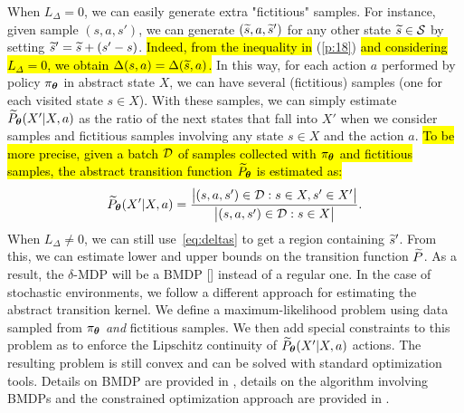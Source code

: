 %
When $L_{\Delta}=0$, we can easily generate extra "fictitious" samples. For instance, given sample $(s,a,s')$, we can generate $(\widetilde{s},a,\widetilde{s}')$ for any other state $\widetilde{s}\in\mathcal{S}$ by setting $\widetilde{s}' = \widetilde{s} + (s'-s)$. \hl{Indeed, from the inequality in} (\ref{p:18}) \hl{and considering $L_{\Delta}=0$, we obtain $\Delta(s,a)=\Delta(\widetilde{s},a)$.} In this way, for each action $a$ performed by policy $\pi_{\boldsymbol{\theta}}$ in abstract state $X$, we can have several (fictitious) samples (one for each visited state $s\in X$). With these samples, we can simply estimate $\widetilde{P}_{\boldsymbol{\theta}}(X'|X,a)$ as the ratio of the next states that fall into $X'$ when we consider samples and fictitious samples involving any state $s \in X$ and the action $a$. \hl{To be more precise, given a batch $\mathcal{D}$ of samples collected with $\pi_{\boldsymbol{\theta}}$ and fictitious samples, the abstract transition function $\widetilde{P}_{\boldsymbol{\theta}}$ is estimated as:}
\begin{align}
	\widetilde{P}_{\boldsymbol{\theta}}(X'|X,a) = \frac{\big|(s,a,s') \in \mathcal{D}: s \in X, s' \in X'\big|}{\big|(s,a,s') \in \mathcal{D}: s \in X\big|}.
\end{align}
When $L_{\Delta}\neq 0$, we can still use~\eqref{eq:deltas} to get a region containing $\widetilde{s}'$.
From this, we can estimate lower and upper bounds on the transition function $\widetilde{P}$. As a result, the $\delta$-\ac{MDP} will be a \ac{BMDP} [\cite{givan2000bounded}] instead of a regular one.
%
In the case of stochastic environments, we follow a different approach for estimating the abstract transition kernel. We define a maximum-likelihood problem using data sampled from $\pi_{\boldsymbol{\theta}}$ \textit{and} fictitious samples. We then add special constraints to this problem as to enforce the Lipschitz continuity of $\widetilde{P}_{\boldsymbol{\theta}}(X'|X,a)$ \wrt actions. The resulting problem is still convex and can be solved with standard optimization tools.
Details on \ac{BMDP} are provided in , details on the algorithm involving \ac{BMDP}s and the constrained optimization approach are provided in . 

